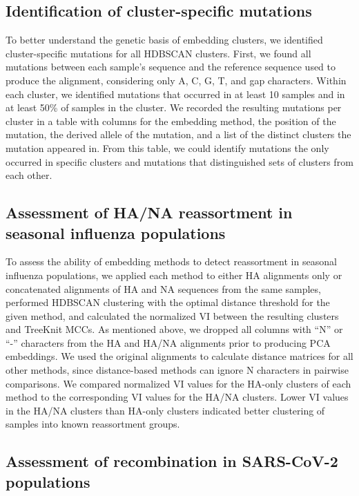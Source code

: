 \documentclass[webpdf,contemporary,large,single]{oup-authoring-template}%
\theoremstyle{thmstyleone}%
\theoremstyle{thmstyletwo}%
\theoremstyle{thmstylethree}%
\begin{document}
\subsection{Identification of cluster-specific mutations}

To better understand the genetic basis of embedding clusters, we identified cluster-specific mutations for all HDBSCAN clusters.
First, we found all mutations between each sample's sequence and the reference sequence used to produce the alignment, considering only A, C, G, T, and gap characters.
Within each cluster, we identified mutations that occurred in at least 10 samples and in at least 50\% of samples in the cluster.
We recorded the resulting mutations per cluster in a table with columns for the embedding method, the position of the mutation, the derived allele of the mutation, and a list of the distinct clusters the mutation appeared in.
From this table, we could identify mutations the only occurred in specific clusters and mutations that distinguished sets of clusters from each other.

\subsection{Assessment of HA/NA reassortment in seasonal influenza populations}

To assess the ability of embedding methods to detect reassortment in seasonal influenza populations, we applied each method to either HA alignments only or concatenated alignments of HA and NA sequences from the same samples, performed HDBSCAN clustering with the optimal distance threshold for the given method, and calculated the normalized VI between the resulting clusters and TreeKnit MCCs.
As mentioned above, we dropped all columns with ``N'' or ``-'' characters from the HA and HA/NA alignments prior to producing PCA embeddings.
We used the original alignments to calculate distance matrices for all other methods, since distance-based methods can ignore N characters in pairwise comparisons.
We compared normalized VI values for the HA-only clusters of each method to the corresponding VI values for the HA/NA clusters.
Lower VI values in the HA/NA clusters than HA-only clusters indicated better clustering of samples into known reassortment groups.

\subsection{Assessment of recombination in SARS-CoV-2 populations}
\end{document}
